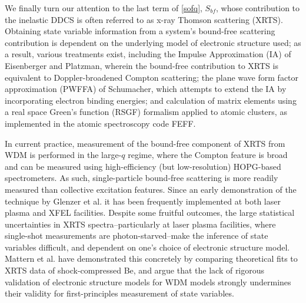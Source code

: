 \documentclass [11pt, proquest, article] {uwthesis}[2016/11/22]
\begin{document}
We finally turn our attention to the last term of \ref{sofq}, $S_{bf}$, whose contribution to the inelastic DDCS is often referred to as x-ray Thomson scattering (XRTS). Obtaining state variable information from a system's bound-free scattering contribution is dependent on the underlying model of electronic structure used; as a result, various treatments exist, including the Impulse Approximation (IA) of Eisenberger and Platzman, wherein the bound-free contribution to XRTS is equivalent to Doppler-broadened Compton scattering; the plane wave form factor approximation (PWFFA) of Schumacher, which attempts to extend the IA by incorporating electron binding energies; and calculation of matrix elements using a real space Green's function (RSGF) formalism applied to atomic clusters, as implemented in the atomic spectroscopy code FEFF. \cite{eisenberger1970compton, mattern2012real}


In current practice, measurement of the  bound-free component of XRTS from WDM is performed in the large-$q$ regime, where the Compton feature is broad and can be measured using high-efficiency (but low-resolution) HOPG-based spectrometers. \cite{lee2009x} As such, single-particle bound-free scattering is more readily measured than collective excitation features. Since an early demonstration of the technique by Glenzer et al. it has been frequently implemented at both laser plasma and XFEL facilities.\cite{glenzer2003demonstration}
   Despite some fruitful outcomes, the large statistical uncertainties in XRTS spectra--particularly at laser plasma facilities, where single-shot measurements are photon-starved--make the inference of state variables difficult, and dependent on one's choice of electronic structure model. \cite{mattern2013condensed} Mattern et al. have demonstrated this concretely by comparing theoretical fits to XRTS data of shock-compressed Be, and argue that the lack of rigorous validation of electronic structure models for WDM models strongly undermines their validity for first-principles measurement of state variables. \cite{mattern2012real}
\end{document}
